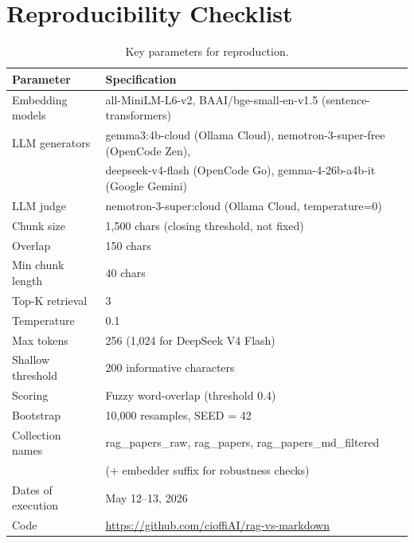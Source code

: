 \documentclass{article}
\begin{document}
\section{Reproducibility Checklist}

\begin{table}[h]
    \centering
    \caption{Key parameters for reproduction.}
    \begin{tabular}{ll}
        \toprule
        Parameter & Specification \\
        \midrule
        Embedding models & all-MiniLM-L6-v2, BAAI/bge-small-en-v1.5 (sentence-transformers) \\
        LLM generators & gemma3:4b-cloud (Ollama Cloud), nemotron-3-super-free (OpenCode Zen), \\
        & deepseek-v4-flash (OpenCode Go), gemma-4-26b-a4b-it (Google Gemini) \\
        LLM judge & nemotron-3-super:cloud (Ollama Cloud, temperature=0) \\
        Chunk size & 1,500 chars (closing threshold, not fixed) \\
        Overlap & 150 chars \\
        Min chunk length & 40 chars \\
        Top-K retrieval & 3 \\
        Temperature & 0.1 \\
        Max tokens & 256 (1,024 for DeepSeek V4 Flash) \\
        Shallow threshold & 200 informative characters \\
        Scoring & Fuzzy word-overlap (threshold 0.4) \\
        Bootstrap & 10,000 resamples, SEED = 42 \\
        Collection names & rag\_papers\_raw, rag\_papers, rag\_papers\_md\_filtered \\
        & (+ embedder suffix for robustness checks) \\
        Dates of execution & May 12--13, 2026 \\
        Code & \url{https://github.com/cioffiAI/rag-vs-markdown} \\
        \bottomrule
    \end{tabular}
\end{table}
\end{document}
